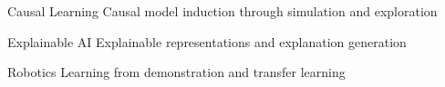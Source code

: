 


\begin{cvskills}


\cvskill
{Causal Learning} %
{Causal model induction through simulation and exploration} %


\cvskill
{Explainable AI} %
{Explainable representations and explanation generation} %




\cvskill
{Robotics} %
{Learning from demonstration and transfer learning} %


\end{cvskills}